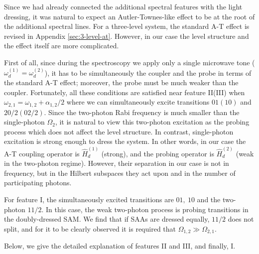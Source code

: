 \documentclass[%
 aps, prx,
 amsmath,amssymb,
 reprint,%
superscriptaddress
]{revtex4-2}
\begin{document}
Since we had already connected the additional 
spectral features with the light dressing, it was 
natural to expect an Autler-Townes-like effect to 
be at the root of the additional spectral lines. 
For a three-level system, the standard A-T effect 
is revised in Appendix \ref{sec:3-level-at}. 
However, in our case the level structure and the 
effect itself are more complicated. 

First of all, since during the spectroscopy we 
apply only a single microwave tone ($\omega_d^{(1)} = 
\omega_d^{(2)}$), it has to be 
simultaneously the coupler and the probe
in terms of the standard A-T effect; moreover, the 
probe must be much weaker than the coupler. 
Fortunately, all these conditions are satisfied near feature II(III) when 
$\omega_{2,1} = 
\omega_{1,2}+\alpha_{1,2}/2$  where we 
can simultaneously excite transitions $01 (10)$ 
and $20/2 (02/2)$. Since the two-photon Rabi 
frequency is much smaller than the single-photon 
$\Omega_2$, it is natural to view this two-photon 
excitation as the probing process which does not 
affect the level structure. In contrast, 
single-photon excitation is strong enough to 
dress the system. In other words, in our case the 
A-T coupling operator is $\hat H_{d}^{(1)}$ (strong), 
and the probing operator is $\hat H_{d}^{(2)}$ (weak 
in the two-photon regime). However, their 
separation in our case is not in frequency, but 
in the Hilbert subspaces they act upon and in the number of participating photons.

For feature I, the simultaneously 
excited transitions are $01,\ 10$ and the 
two-photon $11/2$. In this case, the weak two-photon process is probing transitions in the doubly-dressed SAM. We find that if SAAs are dressed equally, $11/2$ does not split, and for it to be clearly observed it is required that 
$\Omega_{1,2} \gg \Omega_{2,1}$. 

Below, we give the detailed explanation of features II and III, and finally, I.
\end{document}
